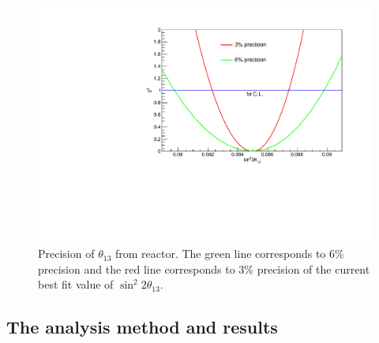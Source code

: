 \documentclass[a4 paper,12pt]{report}%
\begin{document}
     \begin{figure}
 	\centering
 	\includegraphics[scale=0.5]{theta13_precision} 
 	\caption{\label{theta13} Precision of $\theta_{13}$  from reactor. The green line corresponds to 6\% precision and the red line corresponds to 3\% precision of the current best fit value of $\sin^{2}2\theta_{13}$. } 
 \end{figure}

\subsection{The analysis method and results}
\end{document}
